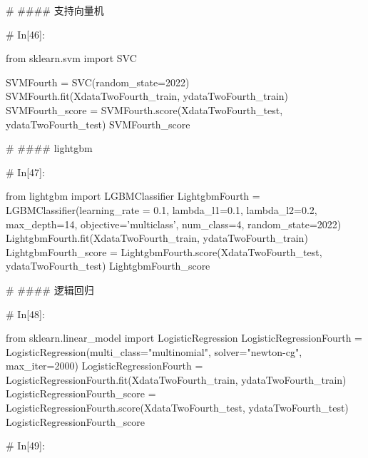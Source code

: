 \documentclass{MathorCupmodeling}
\begin{document}
\begin{python}
# #### 支持向量机

# In[46]:


from sklearn.svm import SVC

SVMFourth = SVC(random_state=2022)
SVMFourth.fit(XdataTwoFourth_train, ydataTwoFourth_train)
SVMFourth_score = SVMFourth.score(XdataTwoFourth_test, ydataTwoFourth_test)
SVMFourth_score


# #### lightgbm

# In[47]:


from lightgbm import LGBMClassifier
LightgbmFourth = LGBMClassifier(learning_rate = 0.1,
                                lambda_l1=0.1,
                                lambda_l2=0.2,
                                max_depth=14,
                                objective='multiclass',
                                num_class=4,
                                random_state=2022)
LightgbmFourth.fit(XdataTwoFourth_train, ydataTwoFourth_train)
LightgbmFourth_score = LightgbmFourth.score(XdataTwoFourth_test, ydataTwoFourth_test)
LightgbmFourth_score


# #### 逻辑回归

# In[48]:


from sklearn.linear_model import LogisticRegression
LogisticRegressionFourth = LogisticRegression(multi_class="multinomial", solver="newton-cg", max_iter=2000)
LogisticRegressionFourth = LogisticRegressionFourth.fit(XdataTwoFourth_train, ydataTwoFourth_train)
LogisticRegressionFourth_score = LogisticRegressionFourth.score(XdataTwoFourth_test, ydataTwoFourth_test)
LogisticRegressionFourth_score


# In[49]:



\end{python}
\end{document}
